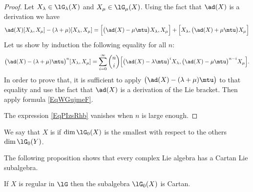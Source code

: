 \begin{proof}
    Let \( X_{\lambda}\in\lG_{\lambda}(X)\) and \( X_{\mu}\in\lG_{\mu}(X)\). Using the fact that \( \ad(X)\) is a derivation we have
    \begin{equation}
        \ad(X)[X_{\lambda},X_{\mu}]-(\lambda+\mu)[X_{\lambda},X_{\mu}]=\Big[ \big( \ad(X)-\mu\mtu \big)X_{\lambda},X_{\mu} \Big]+\Big[ X_{\lambda},\big( \ad(X)+\mu\mtu \big)X_{\mu} \Big]
    \end{equation}
    Let us show by induction the following equality for all \( n\):
    \begin{equation}    \label{EqPIzsRhb}
        \big( \ad(X)-(\lambda+\mu)\mtu \big)^n[X_{\lambda},X_{\mu}]=\sum_{i=0}^{\infty}\binom{ n }{ i }\Big[ \big( \ad(X)-\lambda\mtu \big)^iX_{\lambda},\big( \ad(X)-\mu\mtu \big)^{n-i}X_{\mu} \Big].
    \end{equation}
    In order to prove that, it is sufficient to apply \( \big( \ad(X)-(\lambda+\mu)\mtu \big)\) to that equality and use the fact that \( \ad(X)\) is a derivation of the Lie bracket. Then apply formula \eqref{EqWGujmeF}.

The expression \eqref{EqPIzsRhb} vanishes when \( n\) is large enough.
\end{proof}

We say that \( X\) is  if \( \dim\lG_0(X)\) is the smallest with respect to the others \( \dim\lG_0(Y)\).

The following proposition shows that every complex Lie algebra has a Cartan Lie subalgebra.
\begin{proposition}
    If $X$ is regular in \( \lG\) then the subalgebra \( \lG_0(X)\) is Cartan.
\end{proposition}

